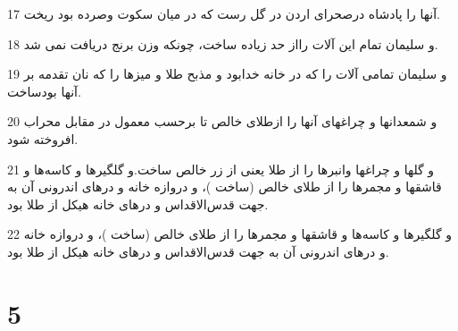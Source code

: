 \par 17 آنها را پادشاه درصحرای اردن در گل رست که در میان سکوت وصرده بود ریخت.
\par 18 و سلیمان تمام این آلات رااز حد زیاده ساخت، چونکه وزن برنج دریافت نمی شد.
\par 19 و سلیمان تمامی آلات را که در خانه خدابود و مذبح طلا و میزها را که نان تقدمه بر آنها بودساخت.
\par 20 و شمعدانها و چراغهای آنها را ازطلای خالص تا برحسب معمول در مقابل محراب افروخته شود.
\par 21 و گلها و چراغها وانبرها را از طلا یعنی از زر خالص ساخت.و گلگیرها و کاسه‌ها و قاشقها و مجمرها را از طلای خالص (ساخت )، و دروازه خانه و درهای اندرونی آن به جهت قدس‌الاقداس و درهای خانه هیکل از طلا بود. 
\par 22 و گلگیرها و کاسه‌ها و قاشقها و مجمرها را از طلای خالص (ساخت )، و دروازه خانه و درهای اندرونی آن به جهت قدس‌الاقداس و درهای خانه هیکل از طلا بود.
 
\chapter{5}

